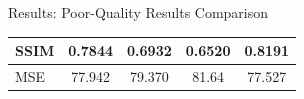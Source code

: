 \documentclass[10pt]{beamer}
\begin{document}
\begin{frame}{Results: Poor-Quality Results Comparison}
\begin{center}
{\begin{tabular}{|l|c|c|c|c|}
\hline
SSIM & 0.7844 & 0.6932 & 0.6520 & 0.8191  \\
\hline
MSE &77.942 & 79.370 & 81.64 & 77.527   \\
\hline
\end{tabular}%
}
\end{center}
\vspace{20mm}
\begin{figure}
  \begin{minipage}{\textwidth}
           \\
  \end{minipage}
\end{figure}

  \end{frame}
\end{document}
